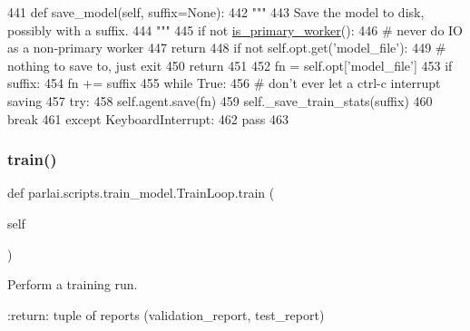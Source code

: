 \begin{DoxyCode}
441     \textcolor{keyword}{def }save\_model(self, suffix=None):
442         \textcolor{stringliteral}{"""}
443 \textcolor{stringliteral}{        Save the model to disk, possibly with a suffix.}
444 \textcolor{stringliteral}{        """}
445         \textcolor{keywordflow}{if} \textcolor{keywordflow}{not} \hyperlink{namespaceparlai_1_1utils_1_1distributed_a9bb1dac198180590ef8c6b6c6f9fc2c4}{is\_primary\_worker}():
446             \textcolor{comment}{# never do IO as a non-primary worker}
447             \textcolor{keywordflow}{return}
448         \textcolor{keywordflow}{if} \textcolor{keywordflow}{not} self.opt.get(\textcolor{stringliteral}{'model\_file'}):
449             \textcolor{comment}{# nothing to save to, just exit}
450             \textcolor{keywordflow}{return}
451 
452         fn = self.opt[\textcolor{stringliteral}{'model\_file'}]
453         \textcolor{keywordflow}{if} suffix:
454             fn += suffix
455         \textcolor{keywordflow}{while} \textcolor{keyword}{True}:
456             \textcolor{comment}{# don't ever let a ctrl-c interrupt saving}
457             \textcolor{keywordflow}{try}:
458                 self.agent.save(fn)
459                 self.\_save\_train\_stats(suffix)
460                 \textcolor{keywordflow}{break}
461             \textcolor{keywordflow}{except} KeyboardInterrupt:
462                 \textcolor{keywordflow}{pass}
463 
\end{DoxyCode}
\mbox{\label{classparlai_1_1scripts_1_1train__model_1_1TrainLoop_a8c15c0d4490891fd3e61e57501474e40}} 
\subsubsection{\texorpdfstring{train()}{train()}}
{\footnotesize\ttfamily def parlai.\+scripts.\+train\+\_\+model.\+Train\+Loop.\+train (\begin{DoxyParamCaption}\item[{}]{self }\end{DoxyParamCaption})}

\begin{DoxyVerb}Perform a training run.

:return: tuple of reports (validation_report, test_report)
\end{DoxyVerb}
 

